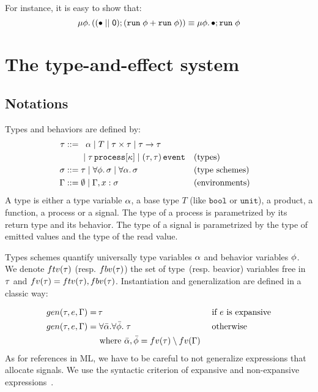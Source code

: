 \documentclass[9pt,preprint]{sigplanconf}
\newcommand{\sdeq}{::=}
\begin{document}
For instance, it is easy to show that:
\[
\mu \phi.\, ((\bullet \mid\mid \textsf{0}) ; (\mathtt{run}\; \phi + \mathtt{run}\; \phi))  \equiv  \mu \phi.\, \bullet ; \mathtt{run}\; \phi
\]

\section{The type-and-effect system}
\label{sec:type_system}



\subsection{Notations}

Types and behaviors are defined by:
\begin{align*}
\rt \sdeq &\;\;\; \rtvar \mid T \mid \rtprod{\rt}{\rt} \mid \rtarrow{\rt}{\rt} \\
    &\;\mid \rtproc{\rt}{\rk} \mid \rtsig{\rt}{\rt} && \text{(types)} \\
\rs \sdeq &\; \rt \mid \forall \effvar.\, \rs \mid \forall \rtvar.\, \rs && \text{(type schemes)} \\
\tyenv \sdeq&\; \emptyset \mid \tyenv \tyconcat x : \rs && \text{(environments)}
\end{align*}
A type is either a type variable $\alpha$, a base type $T$ (like $\mathtt{bool}$ or $\mathtt{unit}$), a product, a function, a process or a signal. The type of a process is parametrized by its return type and its behavior. The type of a signal is parametrized by the type of emitted values and the type of the read value.

Types schemes quantify universally type variables $\alpha$ and behavior variables $\phi$. We denote $ftv(\tau)$ (resp. $fbv(\tau)$) the set of type~(resp. beavior) variables free in $\tau$ and $fv(\tau) = ftv(\tau), fbv(\tau)$. Instantiation and generalization are defined in a classic way:
\vspace{-1.3em}
\begin{align*}
gen(\tau, e, \Gamma) = &\, \tau && \text { if $e$ is expansive} \\
gen(\tau, e, \Gamma) = &\; \forall \bar{\alpha}.\forall \bar{\phi}.\; \tau  && \text{ otherwise } \\
  & \text{ where }  \bar{\alpha}, \bar{\phi} = fv(\tau) \setminus fv(\Gamma)  
\end{align*}
As for references in ML, we have to be careful to not generalize expressions that allocate signals. We use the syntactic criterion of expansive and non-expansive expressions~\cite{Tofte:1990}.
\end{document}
